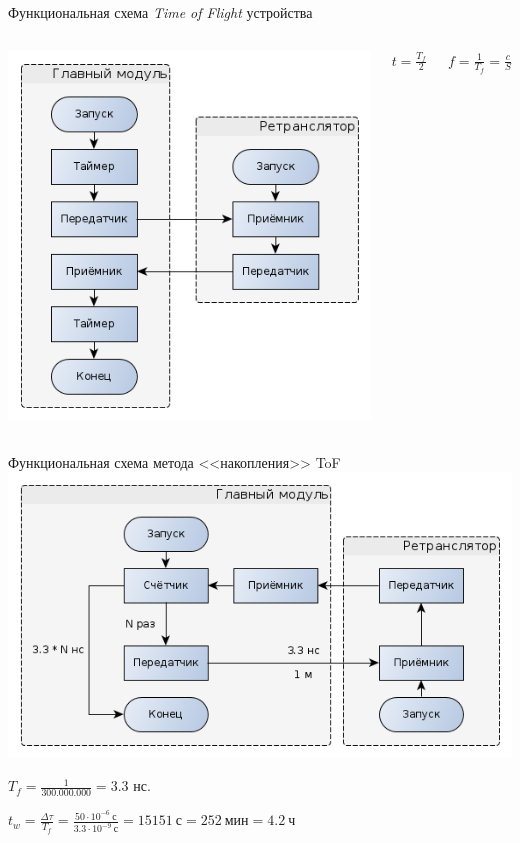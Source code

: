\begin{frame}{Функциональная схема \textit{Time of Flight} устройства}
    \begin{columns}
        \centering
        \includegraphics[width=1\linewidth]{../Figures/tofscheme.png}

        \centering
        \large{$t = \frac{T_f}{2}$}

        \large{$f = \frac{1}{T_f} = \frac{c}{S}$}
    \end{columns}
\end{frame}

\begin{frame}{Функциональная схема метода <<накопления>> ToF}
    \centering
    \includegraphics[width=.8\linewidth]{../Figures/accscheme.png}

    \vfill

    $T_f = \frac{1}{300.000.000} = 3.3$ нс.

    $t_w = \frac{\Delta\tau}{T_f} = \frac{50 \cdot 10^{-6}~\textrm{с}}{3.3 \cdot 10^{-9}~\textrm{с}} = 15151~\textrm{с} = 252~\textrm{мин} = 4.2~\textrm{ч}$
\end{frame}

